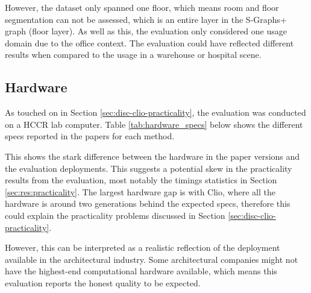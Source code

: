 However, the dataset only spanned one floor, which means room and floor segmentation can not be assessed, which is an entire layer in the S-Graphs+ graph (floor layer). As well as this, the evaluation only considered one usage domain due to the office context. The evaluation could have reflected different results when compared to the usage in a warehouse or hospital scene.

\subsection{Hardware}\label{sec:lim:hardware}

As touched on in Section \ref{sec:disc-clio-practicality}, the evaluation was conducted on a HCCR lab computer. Table \ref{tab:hardware_specs} below shows the different specs reported in the papers for each method.

\begin{table}[H]
\centering
\caption{Evaluation Hardware Specifications.}
\label{tab:hardware_specs}
\end{table}

This shows the stark difference between the hardware in the paper versions and the evaluation deployments. This suggests a potential skew in the practicality results from the evaluation, most notably the timings statistics in Section \ref{sec:res:practicality}. The largest hardware gap is with Clio, where all the hardware is around two generations behind the expected specs, therefore this could explain the practicality problems discussed in Section \ref{sec:disc-clio-practicality}.

However, this can be interpreted as a realistic reflection of the deployment available in the architectural industry. Some architectural companies might not have the highest-end computational hardware available, which means this evaluation reports the honest quality to be expected.

